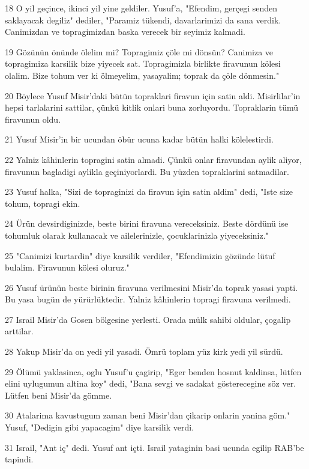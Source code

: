 \par 18 O yil geçince, ikinci yil yine geldiler. Yusuf'a, "Efendim, gerçegi senden saklayacak degiliz" dediler, "Paramiz tükendi, davarlarimizi da sana verdik. Canimizdan ve topragimizdan baska verecek bir seyimiz kalmadi.
\par 19 Gözünün önünde ölelim mi? Topragimiz çöle mi dönsün? Canimiza ve topragimiza karsilik bize yiyecek sat. Topragimizla birlikte firavunun kölesi olalim. Bize tohum ver ki ölmeyelim, yasayalim; toprak da çöle dönmesin."
\par 20 Böylece Yusuf Misir'daki bütün topraklari firavun için satin aldi. Misirlilar'in hepsi tarlalarini sattilar, çünkü kitlik onlari buna zorluyordu. Topraklarin tümü firavunun oldu.
\par 21 Yusuf Misir'in bir ucundan öbür ucuna kadar bütün halki kölelestirdi.
\par 22 Yalniz kâhinlerin topragini satin almadi. Çünkü onlar firavundan aylik aliyor, firavunun bagladigi aylikla geçiniyorlardi. Bu yüzden topraklarini satmadilar.
\par 23 Yusuf halka, "Sizi de topraginizi da firavun için satin aldim" dedi, "Iste size tohum, topragi ekin.
\par 24 Ürün devsirdiginizde, beste birini firavuna vereceksiniz. Beste dördünü ise tohumluk olarak kullanacak ve ailelerinizle, çocuklarinizla yiyeceksiniz."
\par 25 "Canimizi kurtardin" diye karsilik verdiler, "Efendimizin gözünde lütuf bulalim. Firavunun kölesi oluruz."
\par 26 Yusuf ürünün beste birinin firavuna verilmesini Misir'da toprak yasasi yapti. Bu yasa bugün de yürürlüktedir. Yalniz kâhinlerin topragi firavuna verilmedi.
\par 27 Israil Misir'da Gosen bölgesine yerlesti. Orada mülk sahibi oldular, çogalip arttilar.
\par 28 Yakup Misir'da on yedi yil yasadi. Ömrü toplam yüz kirk yedi yil sürdü.
\par 29 Ölümü yaklasinca, oglu Yusuf'u çagirip, "Eger benden hosnut kaldinsa, lütfen elini uylugumun altina koy" dedi, "Bana sevgi ve sadakat gösterecegine söz ver. Lütfen beni Misir'da gömme.
\par 30 Atalarima kavustugum zaman beni Misir'dan çikarip onlarin yanina göm." Yusuf, "Dedigin gibi yapacagim" diye karsilik verdi.
\par 31 Israil, "Ant iç" dedi. Yusuf ant içti. Israil yataginin basi ucunda egilip RAB'be tapindi.

